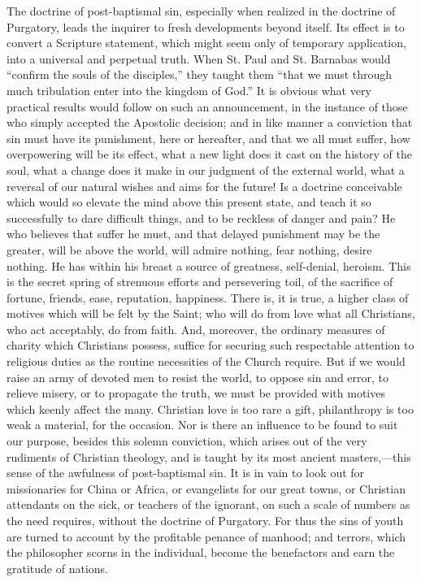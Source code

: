 The doctrine of post-baptismal sin, especially when realized in the
doctrine of Purgatory, leads the inquirer to fresh developments beyond
itself. Its effect is to convert a Scripture statement, which might
seem only of temporary application, into a universal and perpetual
truth. When St. Paul and St. Barnabas would ``confirm the souls of
the disciples,'' they taught them ``that we must through much
tribulation enter into the kingdom of God.'' It is obvious what
very practical results would follow on such an announcement, in the
instance of those who simply accepted the Apostolic decision; and in
like manner a conviction that sin must have its punishment, here or
hereafter, and that we all must suffer, how overpowering will be its
effect, what a new light does it cast on the history of the soul, what
a change does it make in our judgment of the external world, what a
reversal of our natural wishes and aims for the future! Is a doctrine
conceivable which would so elevate the mind above this present state,
and teach it so successfully to dare difficult things, and to be
reckless of danger and pain? He who believes that suffer he must, and
that delayed punishment may be the greater, will be above the world,
will admire nothing, fear nothing, desire nothing. He has within his
breast a source of greatness, self-denial, heroism. This is the secret
spring of strenuous efforts and persevering toil, of the sacrifice of
fortune, friends, ease, reputation, happiness. There is, it is true, a
higher class of motives which will be felt by the Saint; who will do
from love what all Christians, who act acceptably, do from faith. And,
moreover, the ordinary measures of charity which Christians possess,
suffice for securing such respectable attention to religious duties as
the routine necessities of the Church require. But if we would raise
an army of devoted men to resist the world, to oppose sin and error,
to relieve misery, or to propagate the truth, we must be provided with
motives which keenly affect the many. Christian love is too rare a
gift, philanthropy is too weak a material, for the occasion. Nor is
there an influence to be found to suit our purpose, besides this
solemn conviction, which arises out of the very rudiments of Christian
theology, and is taught by its most ancient masters,—this sense of
the awfulness of post-baptismal sin. It is in vain to look out for
missionaries for China or Africa, or evangelists for our great towns,
or Christian attendants on the sick, or teachers of the ignorant, on
such a scale of numbers as the need requires, without the doctrine of
Purgatory. For thus the sins of youth are turned to account by the
profitable penance of manhood; and terrors, which the philosopher
scorns in the individual, become the benefactors and earn the
gratitude of nations.

